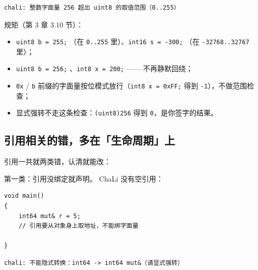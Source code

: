 \par
\medskip
\begin{lstlisting}[style=out]
chali: 整数字面量 256 超出 uint8 的取值范围（0..255）
\end{lstlisting}
\par
\medskip

规矩（第 3 章 3.10 节）：

\begin{itemize}

\item \texttt{uint8 b =\allowbreak{} 255;} \textcolor{green!50!black}{}（在 \texttt{0.\allowbreak{}.\allowbreak{}255} 里）、\texttt{int16 s =\allowbreak{} -300;} \textcolor{green!50!black}{}（在 \texttt{-32768.\allowbreak{}.\allowbreak{}32767} 里）；

\item \texttt{uint8 b =\allowbreak{} 256;} \textcolor{red!80!black}{}、\texttt{int8 x =\allowbreak{} 200;} \textcolor{red!80!black}{} —— 不再静默回绕；

\item \texttt{0x} / \texttt{b} 前缀的字面量按位模式放行（\texttt{int8 x =\allowbreak{} 0x\allowbreak{}FF;} 得到 \texttt{-1}），不做范围检查；

\item 显式强转不走这条检查：\texttt{(\allowbreak{}uint8)\allowbreak{}256} 得到 \texttt{0}，是你签字的结果。

\end{itemize}

\subsection{引用相关的错，多在「生命周期」上}

引用一共就两类错，认清就能改：

第一类：引用没绑定就声明。 ChaLi 没有空引用：

\par
\medskip
\begin{lstlisting}[style=chali]
void main()
{
    int64 mut& r = 5;
    // 引用要从对象身上取地址，不能绑字面量

}
\end{lstlisting}
\par
\medskip

\par
\medskip
\begin{lstlisting}[style=out]
chali: 不能隐式转换：int64 -> int64 mut&（请显式强转）
\end{lstlisting}
\par
\medskip

